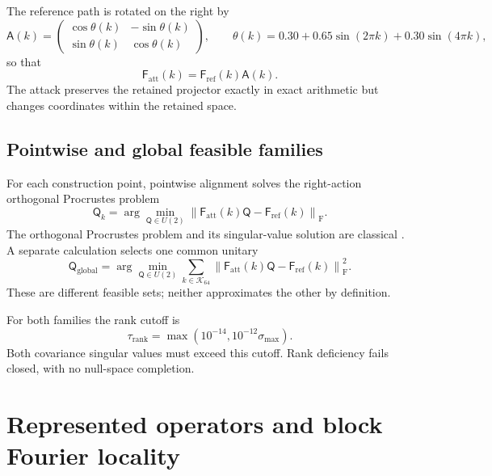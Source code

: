 \documentclass[11pt]{article}
\newcommand{\fro}{\mathrm{F}}
\newcommand{\mat}[1]{\mathsf{#1}}
\begin{document}
The reference path is rotated on the right by
\begin{equation}
 \mat{A}(k)=\begin{pmatrix}
 \cos\theta(k)&-\sin\theta(k)\\
 \sin\theta(k)&\cos\theta(k)
 \end{pmatrix},
 \qquad
 \theta(k)=0.30+0.65\sin(2\pi k)+0.30\sin(4\pi k),
 \label{eq:attack}
\end{equation}
so that
\begin{equation}
 \mat{F}_{\mathrm{att}}(k)=\mat{F}_{\mathrm{ref}}(k)\mat{A}(k).
\end{equation}
The attack preserves the retained projector exactly in exact arithmetic but changes
coordinates within the retained space.

\subsection{Pointwise and global feasible families}

For each construction point, pointwise alignment solves the right-action orthogonal
Procrustes problem
\begin{equation}
 \mat{Q}_{k}=\arg\min_{\mat{Q}\in U(2)}
 \left\|\mat{F}_{\mathrm{att}}(k)\mat{Q}
 -\mat{F}_{\mathrm{ref}}(k)\right\|_{\fro}.
 \label{eq:pointwise-procrustes}
\end{equation}
The orthogonal Procrustes problem and its singular-value solution are classical
\cite{schoenemann1966,golubVanLoan2013}.  A separate calculation selects one common
unitary
\begin{equation}
 \mat{Q}_{\mathrm{global}}=\arg\min_{\mat{Q}\in U(2)}
 \sum_{k\in\mathcal K_{64}}
 \left\|\mat{F}_{\mathrm{att}}(k)\mat{Q}
 -\mat{F}_{\mathrm{ref}}(k)\right\|_{\fro}^{2}.
 \label{eq:global-procrustes}
\end{equation}
These are different feasible sets; neither approximates the other by definition.

For both families the rank cutoff is
\begin{equation}
 \tau_{\mathrm{rank}}=
 \max\left(10^{-14},10^{-12}\sigma_{\max}\right).
 \label{eq:rank-cutoff}
\end{equation}
Both covariance singular values must exceed this cutoff.  Rank deficiency fails closed,
with no null-space completion.

\section{Represented operators and block Fourier locality}
\end{document}
